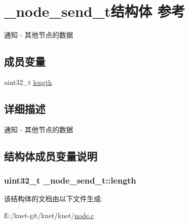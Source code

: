 \hypertarget{a00041}{}\section{\+\_\+node\+\_\+send\+\_\+t结构体 参考}
\label{a00041}


通知 -\/ 其他节点的数据  


\subsection*{成员变量}
\begin{DoxyCompactItemize}
\item 
uint32\+\_\+t \hyperlink{a00041_ad5dc8c41ba239f9cf86a0681d8735ff5_ad5dc8c41ba239f9cf86a0681d8735ff5}{length}
\end{DoxyCompactItemize}


\subsection{详细描述}
通知 -\/ 其他节点的数据 

\subsection{结构体成员变量说明}
\hypertarget{a00041_ad5dc8c41ba239f9cf86a0681d8735ff5_ad5dc8c41ba239f9cf86a0681d8735ff5}{}
\subsubsection[{length}]{\setlength{\rightskip}{0pt plus 5cm}uint32\+\_\+t \+\_\+node\+\_\+send\+\_\+t\+::length}\label{a00041_ad5dc8c41ba239f9cf86a0681d8735ff5_ad5dc8c41ba239f9cf86a0681d8735ff5}


该结构体的文档由以下文件生成\+:\begin{DoxyCompactItemize}
\item 
E\+:/knet-\/git/knet/knet/\hyperlink{a00101}{node.\+c}\end{DoxyCompactItemize}
